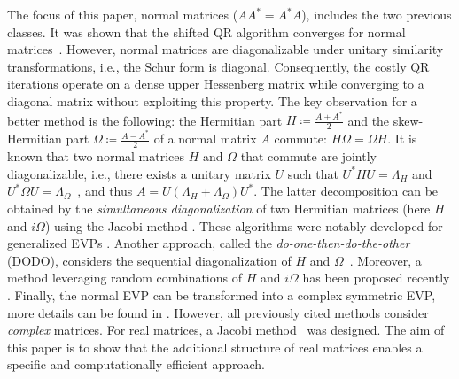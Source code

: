 \documentclass[10pt,twoside,dvipsnames]{siamart1116}
\numberwithin{algorithm}{section}
\numberwithin{equation}{section}
\begin{document}
The focus of this paper, normal matrices ($AA^*=A^*A$), includes the two previous classes. It was shown that the shifted QR algorithm converges for normal matrices~\cite{BATTERSON1994181}. However, normal matrices are diagonalizable under unitary similarity transformations, i.e., the Schur form is diagonal. Consequently, the costly QR iterations operate on a dense upper Hessenberg matrix while converging to a diagonal matrix without exploiting this property. The key observation for a better method is the following: the Hermitian part $H\coloneq\frac{A+A^*}{2}$ and the skew-Hermitian part $\Omega\coloneq\frac{A-A^*}{2}$ of a normal matrix $A$ commute: $H\Omega=\Omega H$. It is known that two normal matrices $H$ and $\Omega$ that commute are jointly diagonalizable, i.e., there exists a unitary matrix $U$ such that $U^*HU = \Lambda_H$ and $U^*\Omega U = \Lambda_\Omega$~\cite[Thm.~2.5.5]{horn13}, and thus $A=U(\Lambda_H+\Lambda_\Omega)U^*$. The latter decomposition can be obtained by the \emph{simultaneous diagonalization} of two Hermitian matrices (here $H$ and $i\Omega$) using the Jacobi method \cite{Gerstner98,Goldstine59}. These algorithms were notably developed for generalized EVPs \cite{CHARLIER1990,WATTERS1974}. Another approach, called the \emph{do-one-then-do-the-other} (DODO), considers the sequential diagonalization of $H$ and $\Omega$~\cite{Sutton23}. Moreover, a method leveraging random combinations of $H$ and $i\Omega$ has been proposed recently \cite{Haoze24}. Finally, the normal EVP can be transformed into a complex symmetric EVP, more details can be found in \cite{Aurentz2017ComputingTE,Ferranti2013,Vandebril2011}. However, all previously cited methods consider \emph{complex} matrices. For real matrices, a Jacobi method~\cite{ZhouBrent03} was designed. The aim of this paper is to show that the additional structure of real matrices enables a specific and computationally efficient approach.
\end{document}
